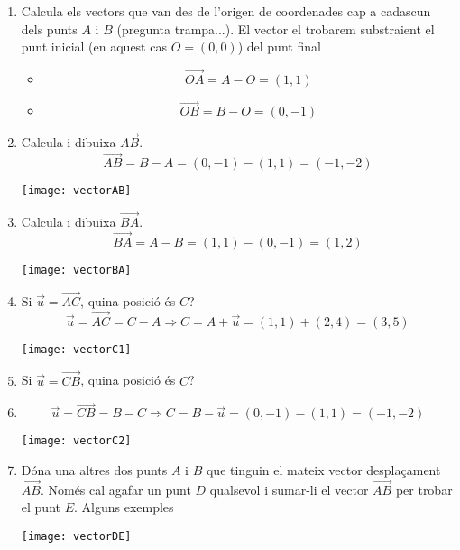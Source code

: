 \Answer
\begin{enumerate}
  \item Calcula els vectors que van des de l'origen de coordenades cap a cadascun dels punts $A$ i $B$ (pregunta trampa...). El vector el trobarem substraient el punt inicial (en aquest cas $O=(0,0)$) del punt final
    \begin{itemize}
      \item \[\overrightarrow{OA}=A-O=(1,1)\]
      \item \[\overrightarrow{OB}=B-O=(0,-1)\]
    \end{itemize}
  \item Calcula i dibuixa $\overrightarrow{AB}$. 
    \[\overrightarrow{AB}=B-A=(0,-1)-(1,1)=(-1,-2)\]
    \begin{center}
      \texttt{[image: vectorAB]}
   \end{center}
  \item Calcula i dibuixa $\overrightarrow{BA}$.
    \[\overrightarrow{BA}=A-B=(1,1)-(0,-1)=(1,2)\]
    \begin{center}
      \texttt{[image: vectorBA]}
    \end{center}
  \item Si $\vec{u}=\overrightarrow{AC}$, quina posició és $C$?
  \[\vec{u}=\overrightarrow{AC} = C-A \Rightarrow C=A+\vec{u}=(1,1)+(2,4)=(3,5)\]
  \begin{center}
    \texttt{[image: vectorC1]}
  \end{center}
  \item Si $\vec{u}=\overrightarrow{CB}$, quina posició és $C$?
  \item   \[\vec{u}=\overrightarrow{CB} = B-C \Rightarrow C=B-\vec{u}=(0,-1)-(1,1)=(-1,-2)\]
  \begin{center}
    \texttt{[image: vectorC2]}
  \end{center}

  \item Dóna una altres dos punts $A$ i $B$ que tinguin el mateix vector desplaçament $\overrightarrow{AB}$.
  Només cal agafar un punt $D$ qualsevol i sumar-li el vector $\overrightarrow{AB}$ per trobar el punt $E$. Alguns exemples
  \begin{center}
    \texttt{[image: vectorDE]}
  \end{center}

\end{enumerate}
\blacksquare 
